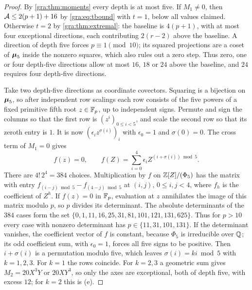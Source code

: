 \begin{proof}
By \cref{gra:thm:moments} every depth is at most five. If $M_1\ne0$, then
$\mathcal{A}\le2(p+1)+16$ by \eqref{gra:eq:tbound} with $t=1$, below all
values claimed. Otherwise $t=2$ by \cref{gra:thm:extremal}: the
baseline is $4(p+1)$, with at most four exceptional directions, each
contributing $2(r-2)$ above the baseline. A direction of depth five forces
$p\equiv1\pmod{10}$; its squared projections are a coset of $\boldsymbol{\mu}_5$
inside the nonzero squares, which also rules out a zero step. Thus zero,
one or four depth-five directions allow at most $16$, $18$ or $24$ above
the baseline, and $24$ requires four depth-five directions.

Take two depth-five directions as coordinate covectors. Squaring is a
bijection on $\boldsymbol{\mu}_5$, so after independent row scalings each row
consists of the five powers of a fixed primitive fifth root $z\in\mathbb{F}_p$, up
to independent signs. Permute and sign the columns so that the first row
is $(z^i)_{0\le i<5}$, and scale the second row so that its zeroth entry is
$1$. It is now $(\epsilon_iz^{\sigma(i)})_i$ with $\epsilon_0=1$ and
$\sigma(0)=0$. The cross term of $M_1=0$ gives
\[
 f(z)=0,\qquad f(Z)=\sum_{i=0}^4\epsilon_iZ^{(i+\sigma(i))\bmod5}.
\]
There are $4!\,2^4=384$ choices. Multiplication by $f$ on $\mathbb{Z}[Z]/(\Phi_5)$
has the matrix with entry $f_{(i-j)\bmod5}-f_{(4-j)\bmod5}$ at $(i,j)$,
$0\le i,j<4$, where $f_h$ is the coefficient of $Z^h$. If $f(z)=0$ in
$\mathbb{F}_p$, evaluation at $z$ annihilates the image of this matrix modulo $p$,
so $p$ divides its determinant. The absolute determinants of the $384$
cases form the set $\{0,1,11,16,25,31,81,101,121,131,625\}$. Thus for
$p>10$ every case with nonzero determinant has $p\in\{11,31,101,131\}$.
If the determinant vanishes, the coefficient vector of $f$ is constant,
because $\Phi_5$ is irreducible over $\mathbb{Q}$; its odd coefficient sum, with
$\epsilon_0=1$, forces all five signs to be positive. Then $i+\sigma(i)$
is a permutation modulo five, which leaves $\sigma(i)=ki\bmod5$ with
$k=1,2,3$. For $k=1$ the rows coincide. For $k=2,3$ a geometric sum gives
$M_2=20X^3Y$ or $20XY^3$, so only the axes are exceptional, both of depth
five, with excess $12$; for $k=2$ this is (e).


\end{proof}
